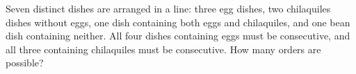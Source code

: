 Seven distinct dishes are arranged in a line: three egg dishes, two chilaquiles dishes without eggs, one dish containing both eggs and chilaquiles, and one bean dish containing neither. All four dishes containing eggs must be consecutive, and all three containing chilaquiles must be consecutive. How many orders are possible?
